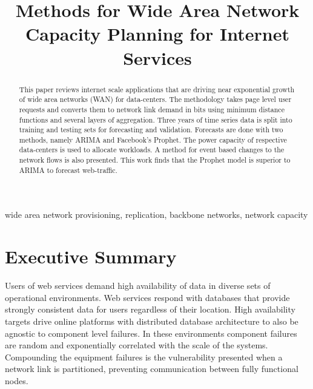 \documentclass[conference]{IEEEtran}
\begin{document}
\title{Methods for Wide Area Network Capacity Planning for Internet Services\\
}

\author{
}

\maketitle

\begin{abstract}
This paper reviews internet scale applications that are driving near exponential growth of wide area networks (WAN) for data-centers. The methodology takes page level user requests and converts them to network link demand in bits using minimum distance functions and several layers of aggregation.  Three years of time series data is split into training and testing sets for forecasting and validation. Forecasts are done with two methods, namely ARIMA and Facebook's Prophet. The power capacity of respective data-centers is used to allocate workloads. A method for event based changes to the network flows is also presented. This work finds that the Prophet model is superior to ARIMA to forecast web-traffic. 


\end{abstract}

\begin{IEEEkeywords}
wide area network provisioning, replication, backbone networks, network capacity
\end{IEEEkeywords}

\section{Executive Summary}

Users of web services demand high availability of data in diverse sets of operational environments. Web services respond with databases that provide strongly consistent data for users regardless of their location. High availability targets drive online platforms with distributed database architecture to also be agnostic to component level failures. In these environments component failures are random and exponentially correlated with the scale of the systems. Compounding the equipment failures is the vulnerability presented when a network link is partitioned, preventing communication between fully functional nodes. 
\end{document}
